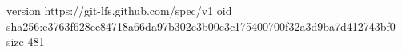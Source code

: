 version https://git-lfs.github.com/spec/v1
oid sha256:e3763f628ce84718a66da97b302c3b00c3c175400700f32a3d9ba7d412743bf0
size 481
